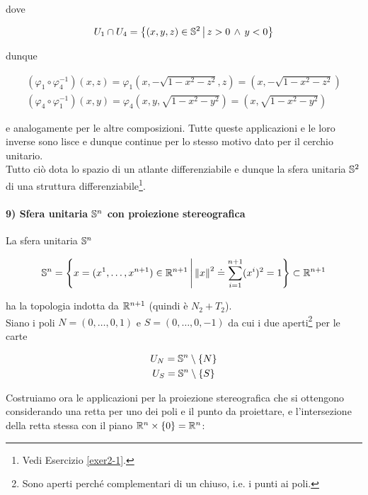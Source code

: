 dove

\begin{equation}
	U_{1} \cap U_{4} = \left\{ (x,y,z) \in \S^{2} \st z>0 \, \wedge \, y<0 \right\}
\end{equation}

dunque

\begin{gather}
	(\varphi_{1} \circ \varphi_{4}^{-1})(x,z) = \varphi_{1} \left( x,-\sqrt{1-x^{2}-z^{2}},z \right) = \left( x,-\sqrt{1-x^{2}-z^{2}} \right) \\
	(\varphi_{4} \circ \varphi_{1}^{-1})(x,y) = \varphi_{4} \left( x,y,\sqrt{1-x^{2}-y^{2}} \right) = \left( x,\sqrt{1-x^{2}-y^{2}} \right)
\end{gather}

e analogamente per le altre composizioni. Tutte queste applicazioni e le loro inverse sono lisce e dunque continue per lo stesso motivo dato per il cerchio unitario. \\
Tutto ciò dota lo spazio di un atlante differenziabile e dunque la sfera unitaria $ \S^{2} $ di una struttura differenziabile\footnote{%
	Vedi Esercizio \ref{exer2-1}.%
}.

\paragraph{9) Sfera unitaria $ \S^{n} $ con proiezione stereografica}

La sfera unitaria $ \S^{n} $

\begin{equation}
	\S^{n} = \left\{ x = (x^{1},\dots,x^{n+1}) \in \R^{n+1} \st \norm{x}^{2} \doteq \sum_{i=1}^{n+1} (x^{i})^{2} = 1 \right\} \subset \R^{n+1}
\end{equation}

ha la topologia indotta da $ \R^{n+1} $ (quindi è $ N_{2}+T_{2} $). \\
Siano i poli $ N = (0,\dots,0,1) $ e $ S = (0,\dots,0,-1) $ da cui i due aperti\footnote{%
	Sono aperti perché complementari di un chiuso, i.e. i punti ai poli.%
} per le carte

\begin{gather}
	U_{N} = \S^{n} \setminus \{N\} \\
	U_{S} = \S^{n} \setminus \{S\}
\end{gather}

Costruiamo ora le applicazioni per la proiezione stereografica che si ottengono considerando una retta per uno dei poli e il punto da proiettare, e l'intersezione della retta stessa con il piano $ \R^{n} \times \{0\} = \R^{n} $:

